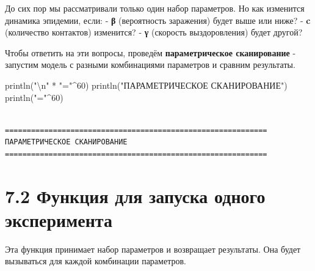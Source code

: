 \documentclass[
  12pt,
  a4paper,
  DIV=11,
  numbers=noendperiod]{scrreprt}
\newenvironment{Shaded}{\begin{snugshade}}{\end{snugshade}}
\newcommand{\FloatTok}[1]{\textcolor[rgb]{0.68,0.00,0.00}{#1}}
\newcommand{\FunctionTok}[1]{\textcolor[rgb]{0.28,0.35,0.67}{#1}}
\newcommand{\NormalTok}[1]{\textcolor[rgb]{0.00,0.23,0.31}{#1}}
\newcommand{\OperatorTok}[1]{\textcolor[rgb]{0.37,0.37,0.37}{#1}}
\newcommand{\SpecialCharTok}[1]{\textcolor[rgb]{0.37,0.37,0.37}{#1}}
\newcommand{\StringTok}[1]{\textcolor[rgb]{0.13,0.47,0.30}{#1}}
\begin{document}
До сих пор мы рассматривали только один набор параметров. Но как
изменится динамика эпидемии, если: - \textbf{β} (вероятность заражения)
будет выше или ниже? - \textbf{c} (количество контактов) изменится? -
\textbf{γ} (скорость выздоровления) будет другой?

Чтобы ответить на эти вопросы, проведём \textbf{параметрическое
сканирование} - запустим модель с разными комбинациями параметров и
сравним результаты.

\begin{Shaded}
\begin{Highlighting}[]
\FunctionTok{println}\NormalTok{(}\StringTok{"}\SpecialCharTok{\textbackslash{}n}\StringTok{"} \OperatorTok{*} \StringTok{"="}\OperatorTok{\^{}}\FloatTok{60}\NormalTok{)}
\FunctionTok{println}\NormalTok{(}\StringTok{"ПАРАМЕТРИЧЕСКОЕ СКАНИРОВАНИЕ"}\NormalTok{)}
\FunctionTok{println}\NormalTok{(}\StringTok{"="}\OperatorTok{\^{}}\FloatTok{60}\NormalTok{)}
\end{Highlighting}
\end{Shaded}

\begin{verbatim}

============================================================
ПАРАМЕТРИЧЕСКОЕ СКАНИРОВАНИЕ
============================================================
\end{verbatim}

\section{7.2 Функция для запуска одного
эксперимента}\label{ux444ux443ux43dux43aux446ux438ux44f-ux434ux43bux44f-ux437ux430ux43fux443ux441ux43aux430-ux43eux434ux43dux43eux433ux43e-ux44dux43aux441ux43fux435ux440ux438ux43cux435ux43dux442ux430}

Эта функция принимает набор параметров и возвращает результаты. Она
будет вызываться для каждой комбинации параметров.
\end{document}
